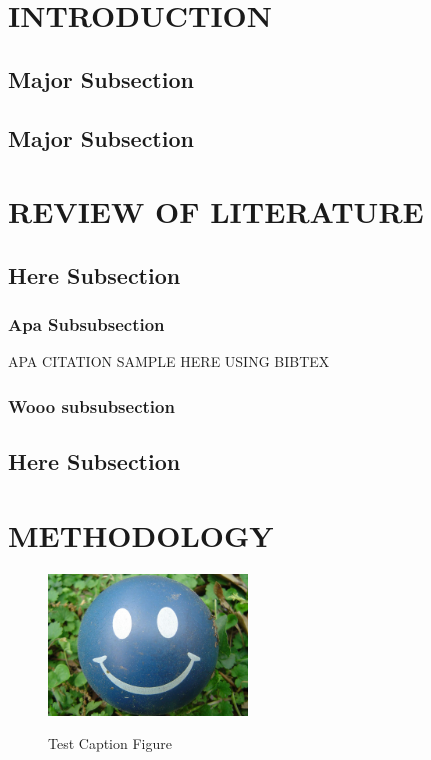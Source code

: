 \documentclass{icsthesis}
\begin{document}
	\begin{mainmatter}
		\section{INTRODUCTION}
			\subsection{Major Subsection}
				\lipsum[4]
			\subsection{Major Subsection}
				\lipsum
		
		\section{REVIEW OF LITERATURE}
			\subsection{Here Subsection}
				\lipsum[4]
				\subsubsection{Apa Subsubsection}
					APA CITATION SAMPLE HERE USING BIBTEX \citep{CrescenziKann1997}
				\subsubsection{Wooo subsubsection}
					\lipsum
			\subsection{Here Subsection}
				\lipsum[6]
				
				
		
		\section{METHODOLOGY}
			\lipsum[1]
			
			\begin{figure}[ht]
			\begin{center}
				\vspace{4ex}
				\includegraphics[width=200px]{figuretest}
				\label{fig:Test Caption Figure}	
				\caption{Test Caption Figure}
			\end{center}
			\end{figure}
			

\end{mainmatter}
\end{document}
